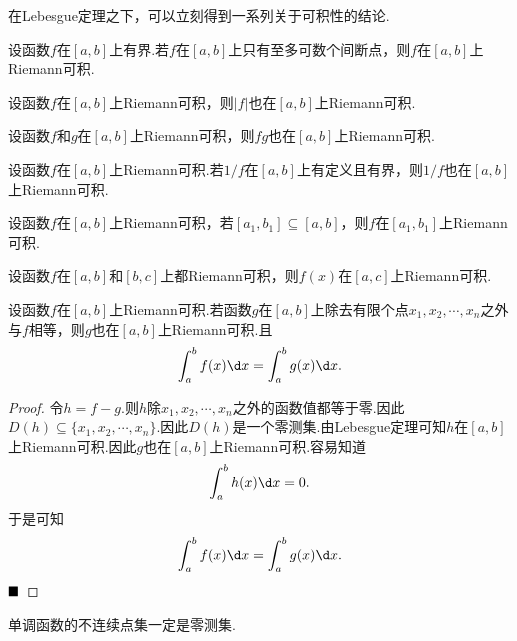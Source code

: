在Lebesgue定理之下，可以立刻得到一系列关于可积性的结论.
\begin{corollary}
	设函数$f$在$\left[a,b\right]$上有界.若$f$在$\left[a,b\right]$上只有至多可数个间断点，则$f$在$\left[a,b\right]$上Riemann可积.
\end{corollary}
\begin{corollary}
	设函数$f$在$\left[a,b\right]$上Riemann可积，则$|f|$也在$\left[a,b\right]$上Riemann可积.
\end{corollary}
\begin{corollary}
	设函数$f$和$g$在$\left[a,b\right]$上Riemann可积，则$fg$也在$\left[a,b\right]$上Riemann可积.
\end{corollary}
\begin{corollary}
	设函数$f$在$\left[a,b\right]$上Riemann可积.若$1/f$在$\left[a,b\right]$上有定义且有界，则$1/f$也在$\left[a,b\right]$上Riemann可积.
\end{corollary}
\begin{corollary}
	设函数$f$在$\left[a,b\right]$上Riemann可积，若$\left[a_1,b_1\right]\subseteq\left[a,b\right]$，则$f$在$\left[a_1,b_1\right]$上Riemann可积.
\end{corollary}
\begin{corollary}
	设函数$f$在$\left[a,b\right]$和$\left[b,c\right]$上都Riemann可积，则$f(x)$在$\left[a,c\right]$上Riemann可积.
\end{corollary}
\begin{corollary}
	设函数$f$在$\left[a,b\right]$上Riemann可积.若函数$g$在$\left[a,b\right]$上除去有限个点$x_1,x_2,\cdots,x_n$之外与$f$相等，则$g$也在$\left[a,b\right]$上Riemann可积.且
	$$\int_{a}^{b}f(x)\d x=\int_{a}^{b}g(x)\d x.$$
\end{corollary}
\begin{proof}
	令$h=f-g$.则$h$除$x_1,x_2,\cdots,x_n$之外的函数值都等于零.因此$D(h)\subseteq\{x_1,x_2,\cdots,x_n\}$.因此$D(h)$是一个零测集.由Lebesgue定理可知$h$在$\left[a,b\right]$上Riemann可积.因此$g$也在$\left[a,b\right]$上Riemann可积.容易知道
	$$\int_{a}^{b}h(x)\d x=0.$$
	于是可知
	$$\int_{a}^{b}f(x)\d x=\int_{a}^{b}g(x)\d x.$$
	$\hfill\blacksquare$
\end{proof}
\begin{corollary}
	单调函数的不连续点集一定是零测集.
\end{corollary}

